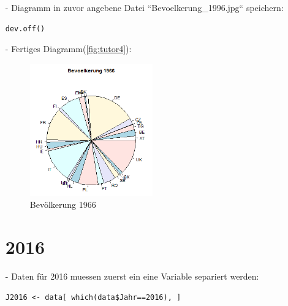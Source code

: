 \begin{itemize}
\item[-]Diagramm in zuvor angebene Datei ``Bevoelkerung\_1996.jpg`` speichern:
\begin{lstlisting}
dev.off()
\end{lstlisting}

\item[-]Fertiges Diagramm(\autoref{fig:tutor4}):
\begin{figure}[!htb]
        \begin{minipage}{1\textwidth}
                \centering
                \includegraphics[width=0.50\textwidth]{pics/tutor4.png}\par\vspace{0cm}
                \caption{Bevölkerung 1966}
                \label{fig:tutor4}
        \end{minipage}
\end{figure}

\section*{2016}
\item[-]Daten für 2016 muessen zuerst ein eine Variable separiert werden:
\begin{lstlisting}
J2016 <- data[ which(data$Jahr==2016), ]		
\end{lstlisting}
		

\end{itemize}
